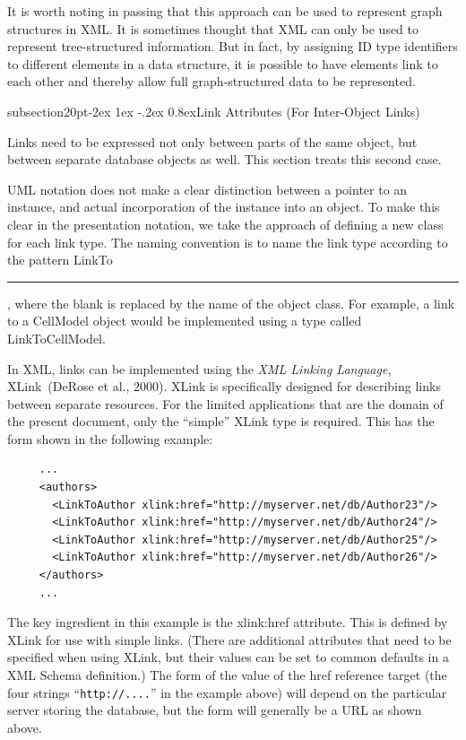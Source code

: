 \documentclass[10pt]{article}
\makeatletter
\renewcommand{\subsection}{\@startsection%
  {subsection}{2}{0pt}{-2ex \@plus 1ex \@minus -.2ex}%
  {0.8ex}{\slshape\large\bfseries}}
\newcommand{\tightspacing}{\renewcommand{\baselinestretch}{0.85}}
\newcommand{\regularspacing}{\renewcommand{\baselinestretch}{1.0}}
\newcommand{\class}[1]{\textsf{#1}}
\newcommand{\attrib}[1]{\textsf{#1}}
\makeatother
\begin{document}
It is worth noting in passing that this approach can be used to represent
graph structures in XML.  It is sometimes thought that XML can only be used
to represent tree-structured information.  But in fact, by assigning
\class{ID} type identifiers to different elements in a data structure, it
is possible to have elements link to each other and thereby allow full
graph-structured data to be represented.


\subsection{Link Attributes (For Inter-Object Links)}

Links need to be expressed not only between parts of the same object, but
between separate database objects as well.  This section treats this second
case.

UML notation does not make a clear distinction between a pointer to an
instance, and actual incorporation of the instance into an object.  To make
this clear in the presentation notation, we take the approach of defining a
new class for each link type.  The naming convention is to name the link
type according to the pattern \class{LinkTo}\rule{0.75in}{0.5pt}, where the
blank is replaced by the name of the object class.  For example, a link to
a \class{CellModel} object would be implemented using a type called
\class{LinkToCellModel}.

In XML, links can be implemented using the \emph{XML Linking Language},
XLink~(DeRose et al., 2000).  XLink is specifically designed for describing
links between separate resources.  For the limited applications that are
the domain of the present document, only the ``simple'' XLink type is
required.  This has the form shown in the following example:
\begin{small}
  \tightspacing
\begin{verbatim}
     ...
     <authors>
       <LinkToAuthor xlink:href="http://myserver.net/db/Author23"/>
       <LinkToAuthor xlink:href="http://myserver.net/db/Author24"/>
       <LinkToAuthor xlink:href="http://myserver.net/db/Author25"/>
       <LinkToAuthor xlink:href="http://myserver.net/db/Author26"/>
     </authors>
     ...
\end{verbatim}
  \regularspacing
\end{small}
The key ingredient in this example is the \attrib{xlink:href} attribute.
This is defined by XLink for use with simple links.  (There are additional
attributes that need to be specified when using XLink, but their values can
be set to common defaults in a XML Schema definition.)  The form of the
value of the \attrib{href} reference target (the four strings
``\texttt{http://....}''  in the example above) will depend on the
particular server storing the database, but the form will generally be a
URL as shown above.
\end{document}
